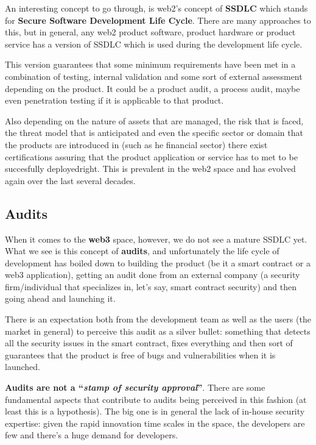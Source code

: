 An interesting concept to go through, is web2's concept of
\textbf{SSDLC} which stands for \textbf{Secure Software Development Life
Cycle}. There are many approaches to this, but in general, any web2
product software, product hardware or product service has a version of
SSDLC which is used during the development life cycle.

This version guarantees that some minimum requirements have been met in
a combination of testing, internal validation and some sort of external
assessment depending on the product. It could be a product audit, a
process audit, maybe even penetration testing if it is applicable to
that product.

Also depending on the nature of assets that are managed, the risk that
is faced, the threat model that is anticipated and even the specific
sector or domain that the products are introduced in (such as he
financial sector) there exist certifications assuring that the product
application or service has to met to be succesfully deployedright. This
is prevalent in the web2 space and has evolved again over the last
several decades.

\subsection{Audits}\label{audits}

When it comes to the \textbf{web3} space, however, we do not see a
mature SSDLC yet. What we see is this concept of \textbf{audits}, and
unfortunately the life cycle of development has boiled down to building
the product (be it a smart contract or a web3 application), getting an
audit done from an external company (a security firm/individual that
specializes in, let's say, smart contract security) and then going ahead
and launching it.

There is an expectation both from the development team as well as the
users (the market in general) to perceive this audit as a silver bullet:
something that detects all the security issues in the smart contract,
fixes everything and then sort of guarantees that the product is free of
bugs and vulnerabilities when it is launched.

\textbf{Audits are not a ``\emph{stamp of security approval}''}. There
are some fundamental aspects that contribute to audits being perceived
in this fashion (at least this is a hypothesis). The big one is in
general the lack of in-house security expertise: given the rapid
innovation time scales in the space, the developers are few and there's
a huge demand for developers.

